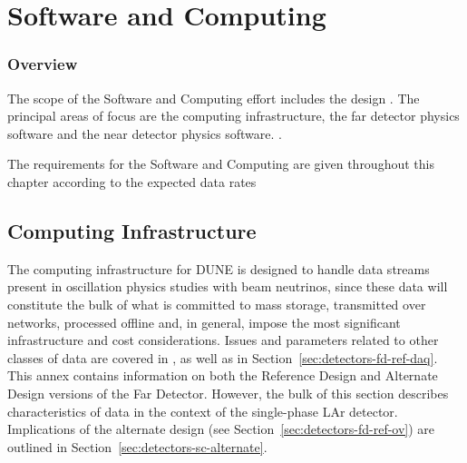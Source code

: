 \chapter{Software and Computing}
\label{ch:detectors-sc}

\subsection{Overview}

The scope of the Software and Computing effort includes the design . The principal areas of focus are the computing 
infrastructure, the far detector physics software and the near detector physics software. .

The requirements for the Software and Computing are given throughout this chapter according to the expected data rates \fixme{}


\section{Computing Infrastructure}
\label{sec:detectors-sc-infrastructure}

The computing infrastructure for DUNE is designed to handle data streams present in
oscillation physics studies with beam neutrinos, since these data will constitute the bulk of what is 
committed to mass storage, transmitted over networks, processed offline and, in general, impose the 
most significant infrastructure and cost considerations. Issues and parameters related to other classes of 
data are covered in \anxrates, as well as in Section~\ref{sec:detectors-fd-ref-daq}.  This 
annex contains information on both the Reference Design and Alternate Design versions of the Far Detector.
However, the bulk of this section describes characteristics of data in the context of the single-phase LAr detector. 
Implications of the alternate design (see Section~\ref{sec:detectors-fd-ref-ov}) are outlined in 
Section~\ref{sec:detectors-sc-alternate}.

